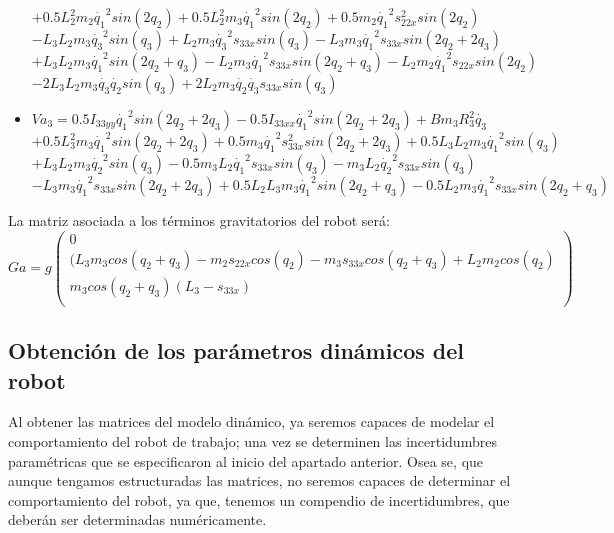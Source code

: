 \begin{itemize}
	$+0.5L_{2}^{2}m_{2} \dot{q_{1}}^{2}sin(2q_{2}) +0.5L_{2}^{2}m_{3} \dot{q_{1}}^{2}sin(2q_{2}) +0.5m_{2} \dot{q_{1}}^{2}s_{22x}^{2}sin(2q_{2}) $ \\ \vspace{0.1cm}
	$-L_{3}L_{2}m_{3} \dot{q_{3}}^{2}sin(q_{3}) +L_{2}m_{3}\dot{q_{3}}^{2}s_{33x}sin(q_{3}) -L_{3}m_{3}\dot{q_{1}}^{2}s_{33x}sin(2q_{2}+2q_{3}) $ \\ \vspace{0.1cm}
	$ +L_{3}L_{2}m_{3} \dot{q_{1}}^{2}sin(2q_{2}+q_{3}) -L_{2}m_{3}\dot{q_{1}}^{2}s_{33x}sin(2q_{2}+q_{3}) -L_{2}m_{2}\dot{q_{1}}^{2}s_{22x}sin(2q_{2}) $ \\ \vspace{0.1cm}
	$-2L_{3}L_{2}m_{3} \dot{q_{3}}\dot{q_{2}}sin(q_{3}) +2L_{2}m_{3} \dot{q_{2}}\dot{q_{3}}s_{33x}sin(q_{3}) $ \\ \vspace{0.2cm}

\newpage
	\item $Va_{3}=0.5I_{33yy}\dot{q_{1}}^{2}sin(2q_{2}+2q_{3}) -0.5I_{33xx}\dot{q_{1}}^{2}sin(2q_{2}+2q_{3}) +Bm_{3}R_{3}^{2}\dot{q_{3}} $ \\ \vspace{0.1cm}
	$ +0.5L_{3}^{2}m_{3} \dot{q_{1}}^{2}sin(2q_{2}+2q_{3}) +0.5m_{3}\dot{q_{1}}^{2}s_{33x}^{2}sin(2q_{2}+2q_{3}) +0.5L_{3}L_{2}m_{3} \dot{q_{1}}^{2}sin(q_{3}) $ \\ \vspace{0.1cm}
	$+L_{3}L_{2}m_{3} \dot{q_{2}}^{2}sin(q_{3}) -0.5m_{3}L_{2}\dot{q_{1}}^{2}s_{33x}sin(q_{3}) -m_{3}L_{2}\dot{q_{2}}^{2}s_{33x}sin(q_{3}) $ \\ \vspace{0.1cm}
	$-L_{3}m_{3}\dot{q_{1}}^{2}s_{33x}sin(2q_{2}+2q_{3}) +0.5L_{2}L_{3}m_{3}\dot{q_{1}}^{2}sin(2q_{2}+q_{3}) -0.5L_{2}m_{3}\dot{q_{1}}^{2}s_{33x}sin(2q_{2}+q_{3})$ \\
\end{itemize}
La matriz asociada a los términos gravitatorios del robot será:
\[
Ga=g
\begin{pmatrix}
0\\
(L_{3}m_{3}cos(q_{2}+q_{3})-m_{2}s_{22x}cos(q_{2})-m_{3}s_{33x}cos(q_{2}+q_{3})+L_{2}m_{2}cos(q_{2})\\
m_{3}cos(q_{2}+q_{3})(L_{3}-s_{33x})\\
\end{pmatrix} \]

\subsection{Obtención de los parámetros dinámicos del robot}
Al obtener las matrices del modelo dinámico, ya seremos capaces de modelar el comportamiento del robot de trabajo;
una vez se determinen las incertidumbres paramétricas que se especificaron al inicio del apartado anterior.
Osea se, que aunque tengamos estructuradas las matrices, no seremos capaces de determinar el comportamiento
del robot, ya que, tenemos un compendio de incertidumbres, que deberán ser determinadas numéricamente.\\

